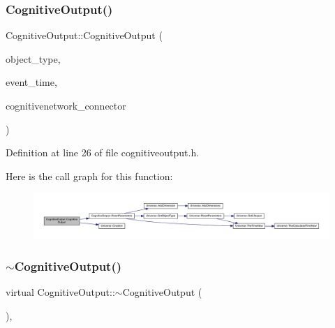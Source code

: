 \subsubsection{\texorpdfstring{Cognitive\+Output()}{CognitiveOutput()}\hspace{0.1cm}{\footnotesize\ttfamily [4/4]}}
{\footnotesize\ttfamily Cognitive\+Output\+::\+Cognitive\+Output (\begin{DoxyParamCaption}\item[{unsigned int}]{object\+\_\+type,  }\item[{std\+::chrono\+::time\+\_\+point$<$ \hyperlink{universe_8h_a0ef8d951d1ca5ab3cfaf7ab4c7a6fd80}{Clock} $>$}]{event\+\_\+time,  }\item[{\hyperlink{class_cognitive_network}{Cognitive\+Network} \&}]{cognitivenetwork\+\_\+connector }\end{DoxyParamCaption})\hspace{0.3cm}{\ttfamily [inline]}}



Definition at line 26 of file cognitiveoutput.\+h.

Here is the call graph for this function\+:
\nopagebreak
\begin{figure}[H]
\begin{center}
\leavevmode
\includegraphics[width=350pt]{class_cognitive_output_a9874901c7b49a6bb495d34c84fdbf651_cgraph}
\end{center}
\end{figure}
\mbox{\label{class_cognitive_output_aefe310a8577684210d82236033791036}} 
\subsubsection{\texorpdfstring{$\sim$\+Cognitive\+Output()}{~CognitiveOutput()}}
{\footnotesize\ttfamily virtual Cognitive\+Output\+::$\sim$\+Cognitive\+Output (\begin{DoxyParamCaption}{ }\end{DoxyParamCaption})\hspace{0.3cm}{\ttfamily [inline]}, {\ttfamily [virtual]}}

